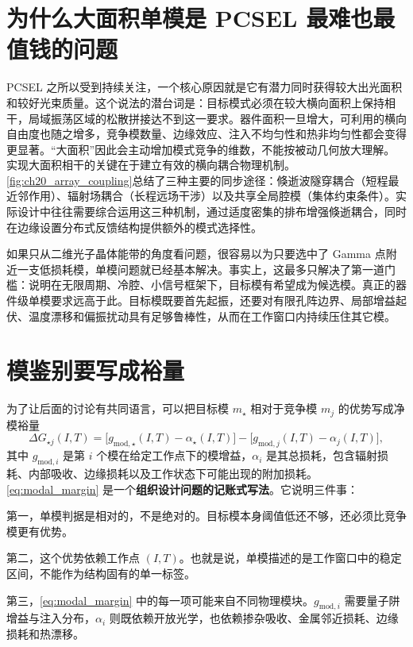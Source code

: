 \section{为什么大面积单模是 PCSEL 最难也最值钱的问题}
PCSEL 之所以受到持续关注，一个核心原因就是它有潜力同时获得较大出光面积和较好光束质量。这个说法的潜台词是：目标模式必须在较大横向面积上保持相干，局域振荡区域的松散拼接达不到这一要求。器件面积一旦增大，可利用的横向自由度也随之增多，竞争模数量、边缘效应、注入不均匀性和热非均匀性都会变得更显著。“大面积”因此会主动增加模式竞争的维数，不能按被动几何放大理解。
实现大面积相干的关键在于建立有效的横向耦合物理机制。\cref{fig:ch20_array_coupling}总结了三种主要的同步途径：倏逝波隧穿耦合（短程最近邻作用）、辐射场耦合（长程远场干涉）以及共享全局腔模（集体约束条件）。实际设计中往往需要综合运用这三种机制，通过适度密集的排布增强倏逝耦合，同时在边缘设置分布式反馈结构提供额外的模式选择性。



如果只从二维光子晶体能带的角度看问题，很容易以为只要选中了 Gamma 点附近一支低损耗模，单模问题就已经基本解决。事实上，这最多只解决了第一道门槛：说明在无限周期、冷腔、小信号框架下，目标模有希望成为候选模。真正的器件级单模要求远高于此。目标模既要首先起振，还要对有限孔阵边界、局部增益起伏、温度漂移和偏振扰动具有足够鲁棒性，从而在工作窗口内持续压住其它模。

\section{模鉴别要写成裕量}
为了让后面的讨论有共同语言，可以把目标模 $m_\star$ 相对于竞争模 $m_j$ 的优势写成净模裕量
\begin{equation}
\Delta G_{\star j}(I,T)
=
\bigl[g_{\mathrm{mod},\star}(I,T)-\alpha_{\star}(I,T)\bigr]
-
\bigl[g_{\mathrm{mod},j}(I,T)-\alpha_{j}(I,T)\bigr],
\label{eq:modal_margin}
\end{equation}
其中 $g_{\mathrm{mod},i}$ 是第 $i$ 个模在给定工作点下的模增益，$\alpha_i$ 是其总损耗，包含辐射损耗、内部吸收、边缘损耗以及工作状态下可能出现的附加损耗。\cref{eq:modal_margin} 是一个\textbf{组织设计问题的记账式写法}。它说明三件事：

第一，单模判据是相对的，不是绝对的。目标模本身阈值低还不够，还必须比竞争模更有优势。

第二，这个优势依赖工作点 $(I,T)$。也就是说，单模描述的是工作窗口中的稳定区间，不能作为结构固有的单一标签。

第三，\cref{eq:modal_margin} 中的每一项可能来自不同物理模块。$g_{\mathrm{mod},i}$ 需要量子阱增益与注入分布，$\alpha_i$ 则既依赖开放光学，也依赖掺杂吸收、金属邻近损耗、边缘损耗和热漂移。

